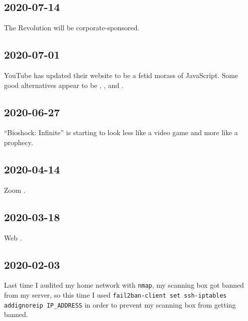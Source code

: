 \documentclass{article}
\begin{document}
\subsection{2020-07-14}
The Revolution will be corporate-sponsored.

\subsection{2020-07-01}
YouTube has updated their website to be a fetid morass of JavaScript.  Some good alternatives appear to be , , and .

\subsection{2020-06-27}
``Bioshock: Infinite'' is starting to look less like a video game and more like a prophecy.

\subsection{2020-04-14}
Zoom .

\subsection{2020-03-18}
Web .

\subsection{2020-02-03}
Last time I audited my home network with \texttt{nmap}, my scanning box got banned from my server, so this time I used \texttt{fail2ban-client set ssh-iptables addignoreip IP\_ADDRESS} in order to prevent my scanning box from getting banned.
\end{document}
